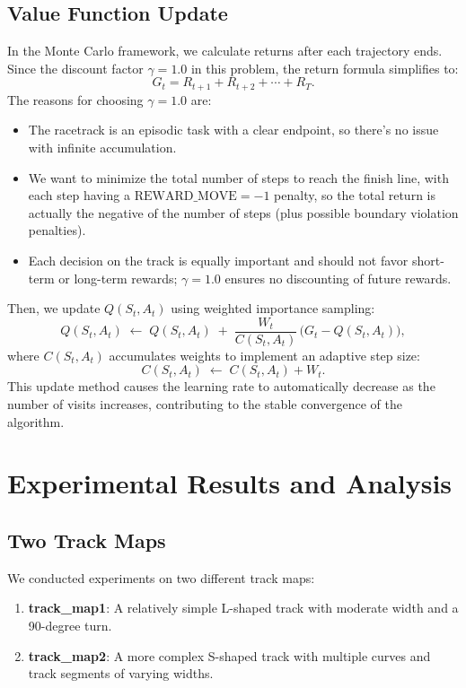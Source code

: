 \documentclass{article}
\begin{document}
\subsection{Value Function Update}
In the Monte Carlo framework, we calculate returns after each trajectory ends. Since the discount factor \(\gamma = 1.0\) in this problem, the return formula simplifies to:
\[
G_t = R_{t+1} + R_{t+2} + \cdots + R_T.
\]
The reasons for choosing \(\gamma = 1.0\) are:
\begin{itemize}
    \item The racetrack is an episodic task with a clear endpoint, so there's no issue with infinite accumulation.
    \item We want to minimize the total number of steps to reach the finish line, with each step having a \(\text{REWARD\_MOVE} = -1\) penalty, so the total return is actually the negative of the number of steps (plus possible boundary violation penalties).
    \item Each decision on the track is equally important and should not favor short-term or long-term rewards; \(\gamma = 1.0\) ensures no discounting of future rewards.
\end{itemize}
Then, we update \(Q(S_t, A_t)\) using weighted importance sampling:
\[
Q(S_t, A_t) \;\leftarrow\; Q(S_t, A_t) \;+\; \frac{W_t}{C(S_t, A_t)} \,\bigl(G_t - Q(S_t, A_t)\bigr),
\]
where \(C(S_t, A_t)\) accumulates weights to implement an adaptive step size:
\[
C(S_t, A_t) \;\leftarrow\; C(S_t, A_t) + W_t.
\]
This update method causes the learning rate to automatically decrease as the number of visits increases, contributing to the stable convergence of the algorithm. 




\section{Experimental Results and Analysis}
\subsection{Two Track Maps}
We conducted experiments on two different track maps:

\begin{enumerate}
    \item \textbf{track\_map1}: A relatively simple L-shaped track with moderate width and a 90-degree turn.
    \item \textbf{track\_map2}: A more complex S-shaped track with multiple curves and track segments of varying widths.
\end{enumerate}
\end{document}
